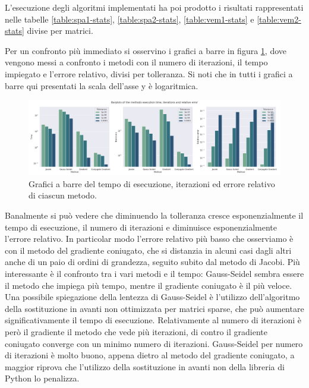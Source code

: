 \documentclass[12pt]{article}
\begin{document}
L'esecuzione degli algoritmi implementati ha poi prodotto i risultati rappresentati nelle tabelle \ref{table:spa1-stats}, \ref{table:spa2-stats}, \ref{table:vem1-stats} e \ref{table:vem2-stats} divise per matrici.

Per un confronto più immediato si osservino i grafici a barre in figura \ref{fig:tie-b}, dove vengono messi a confronto i metodi con il numero di iterazioni, il tempo impiegato e l'errore relativo, divisi per tolleranza. 
Si noti che in tutti i grafici a barre qui presentati la scala dell'asse y è logaritmica.

\begin{figure}[!ht]
    \begin{center}
    \includegraphics[width=\textwidth]{images/time-iterations-error_barplots.png}
    \caption{Grafici a barre del tempo di esecuzione, iterazioni ed errore relativo di ciascun metodo.}
    \label{fig:tie-b}
    \end{center}
\end{figure}

Banalmente si può vedere che diminuendo la tolleranza cresce esponenzialmente il tempo di esecuzione, il numero di iterazioni e diminuisce esponenzialmente l'errore relativo. In particolar modo l'errore relativo più basso che osserviamo è con il metodo del gradiente coniugato, che si distanzia in alcuni casi dagli altri anche di un paio di ordini di grandezza, seguito subito dal metodo di Jacobi.
Più interessante è il confronto tra i vari metodi e il tempo: Gauss-Seidel sembra essere il metodo che impiega più tempo, mentre il gradiente coniugato è il più veloce. Una possibile spiegazione della lentezza di Gauss-Seidel è l'utilizzo dell'algoritmo della sostituzione in avanti non ottimizzata per matrici sparse, che può aumentare significativamente il tempo di esecuzione.
Relativamente al numero di iterazioni è però il gradiente il metodo che vede più iterazioni, di contro il gradiente coniugato converge con un minimo numero di iterazioni. Gauss-Seidel per numero di iterazioni è molto buono, appena dietro al metodo del gradiente coniugato, a maggior riprova che l'utilizzo della sostituzione in avanti non della libreria di Python lo penalizza.
\end{document}
